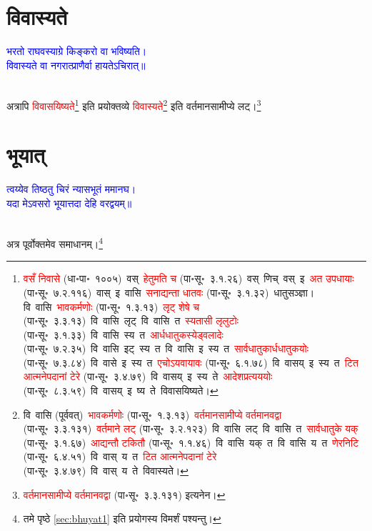 \section[विवास्यते]{विवास्यते}
\centering\textcolor{blue}{भरतो राघवस्याग्रे किङ्करो वा भविष्यति।\nopagebreak\\
विवास्यते वा नगरात्प्राणैर्वा हायतेऽचिरात्॥}\nopagebreak\\
\\
\fontsize{14}{21}\selectfont\begin{sloppypar}\justifying\noindent\hspace{10mm} अत्रापि \textcolor{red}{विवासयिष्यते}\footnote{\textcolor{red}{वसँ निवासे} (धा॰पा॰~१००५)~\arrow वस्~\arrow \textcolor{red}{हेतुमति च} (पा॰सू॰~३.१.२६)~\arrow वस्~णिच्~\arrow वस्~इ~\arrow \textcolor{red}{अत उपधायाः} (पा॰सू॰~७.२.११६)~\arrow वास्~इ~\arrow वासि~\arrow \textcolor{red}{सनाद्यन्ता धातवः} (पा॰सू॰~३.१.३२)~\arrow धातु\-सञ्ज्ञा। वि~वासि~\arrow \textcolor{red}{भावकर्मणोः} (पा॰सू॰~१.३.१३)~\arrow \textcolor{red}{लृट् शेषे च} (पा॰सू॰~३.३.१३)~\arrow वि~वासि~लृट्~\arrow वि~वासि~त~\arrow \textcolor{red}{स्यतासी लृलुटोः} (पा॰सू॰~३.१.३३)~\arrow वि~वासि~स्य~त~\arrow \textcolor{red}{आर्धधातुकस्येड्वलादेः} (पा॰सू॰~७.२.३५)~\arrow वि~वासि~इट्~स्य~त~\arrow वि~वासि~इ~स्य~त~\arrow \textcolor{red}{सार्वधातुकार्ध\-धातुकयोः} (पा॰सू॰~७.३.८४)~\arrow वि~वासे~इ~स्य~त~\arrow \textcolor{red}{एचोऽयवायावः} (पा॰सू॰~६.१.७८)~\arrow वि~वासय्~इ~स्य~त~\arrow \textcolor{red}{टित आत्मनेपदानां टेरे} (पा॰सू॰~३.४.७९)~\arrow वि~वासय्~इ~स्य~ते~\arrow \textcolor{red}{आदेश\-प्रत्यययोः} (पा॰सू॰~८.३.५९)~\arrow वि~वासय्~इ~ष्य~ते~\arrow विवासयिष्यते।} इति प्रयोक्तव्ये \textcolor{red}{विवास्यते}\footnote{वि~वासि (पूर्ववत्)~\arrow \textcolor{red}{भावकर्मणोः} (पा॰सू॰~१.३.१३)~\arrow \textcolor{red}{वर्तमान\-सामीप्ये वर्तमानवद्वा} (पा॰सू॰~३.३.१३१)~\arrow \textcolor{red}{वर्तमाने लट्} (पा॰सू॰~३.२.१२३)~\arrow वि~वासि~लट्~\arrow वि~वासि~त~\arrow \textcolor{red}{सार्वधातुके यक्} (पा॰सू॰~३.१.६७)~\arrow \textcolor{red}{आद्यन्तौ टकितौ} (पा॰सू॰~१.१.४६)~\arrow वि~वासि~यक्~त~\arrow वि~वासि~य~त~\arrow \textcolor{red}{णेरनिटि} (पा॰सू॰~६.४.५१)~\arrow वि~वास्~य~त~\arrow \textcolor{red}{टित आत्मनेपदानां टेरे} (पा॰सू॰~३.४.७९)~\arrow वि~वास्~य~ते~\arrow विवास्यते।
} इति वर्तमान\-सामीप्ये लट्।\footnote{\textcolor{red}{वर्तमान\-सामीप्ये वर्तमानवद्वा} (पा॰सू॰~३.३.१३१) इत्यनेन।}\end{sloppypar}
\section[भूयात्]{भूयात्}
\centering\textcolor{blue}{त्वय्येव तिष्ठतु चिरं न्यासभूतं ममानघ।\nopagebreak\\
यदा मेऽवसरो भूयात्तदा देहि वरद्वयम्॥}\nopagebreak\\
\\
\fontsize{14}{21}\selectfont\begin{sloppypar}\justifying\noindent\hspace{10mm} अत्र पूर्वोक्तमेव समाधानम्।\footnote{\pageref{sec:bhuyat1}तमे पृष्ठे \ref{sec:bhuyat1}  इति प्रयोगस्य विमर्शं पश्यन्तु।}\end{sloppypar}
